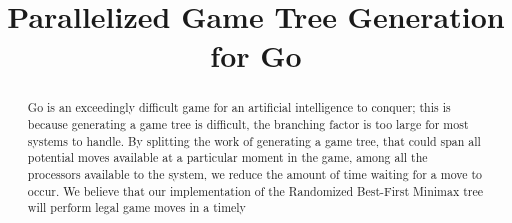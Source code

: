 \documentclass[conference]{IEEEtran}
\begin{document}
\title{Parallelized Game Tree Generation\\for Go}


\author{
}

\maketitle


\begin{abstract}
Go is an exceedingly difficult game for an artificial intelligence to conquer; this is because generating a game tree is difficult, the branching factor is too large for most systems to handle. By splitting the work of generating a game tree, that could span all potential moves available at a particular moment in the game, among all the processors available to the system, we reduce the amount of time waiting for a move to occur. We believe that our implementation of the Randomized Best-First Minimax tree will perform legal game moves in a timely  

\end{abstract}
\end{document}
